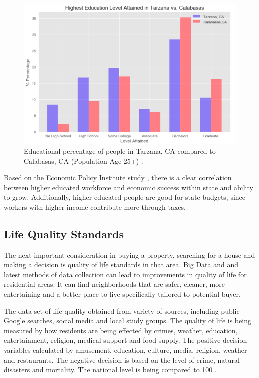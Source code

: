 \documentclass[sigconf]{acmart}
\begin{document}
\begin{figure}
  \centering
  \includegraphics[width=1.0\columnwidth]{images/figure2.png}
  \caption{Educational percentage of people in Tarzana, CA compared to Calabasas, CA (Population Age 25+) \cite{md}.} \label{fig:figure2} 
\end{figure}

Based on the Economic Policy Institute study \cite{education}, there is a clear correlation between higher educated workforce and economic success within state and ability to grow. Additionally, higher educated people are good for state budgets, since workers with higher income contribute more through taxes. 

\subsection{Life Quality Standards}

The next important consideration in buying a property, searching for a house and making a decision is quality of life standards in that area. Big Data and and latest methods of data collection can lead to improvements in quality of life for residential areas. It can find neighborhoods that are safer, cleaner, more entertaining and a better place to live specifically tailored to potential buyer. 

The data-set of life quality obtained from variety of sources, including public Google searches, social media and local study groups. The quality of life is being measured by how residents are being effected by crimes, weather, education, entertainment, religion, medical support and food supply.    
The positive decision variables calculated by amusement, education, culture, media, religion, weather and restaurants. The negative decision is based on the level of crime, natural disasters and mortality. The  national level is being compared to 100 \cite{clr}.   
\end{document}
